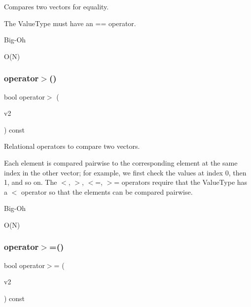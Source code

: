 Compares two vectors for equality. 

The Value\+Type must have an == operator. \begin{DoxyRefDesc}{Big-\/\+Oh}
\item[\mbox{\hyperlink{BigOh__BigOh000146}{Big-\/\+Oh}}]O(\+N) \end{DoxyRefDesc}
\mbox{\label{classVector_a0b8b14442cb420ffaecc0606345e73a1}} 
\subsubsection{\texorpdfstring{operator$>$()}{operator>()}}
{\footnotesize\ttfamily bool operator$>$ (\begin{DoxyParamCaption}\item[{const \mbox{\hyperlink{classVector}{Vector}}$<$ Value\+Type $>$ \&}]{v2 }\end{DoxyParamCaption}) const}



Relational operators to compare two vectors. 

Each element is compared pairwise to the corresponding element at the same index in the other vector; for example, we first check the values at index 0, then 1, and so on. The $<$, $>$, $<$=, $>$= operators require that the Value\+Type has a $<$ operator so that the elements can be compared pairwise. \begin{DoxyRefDesc}{Big-\/\+Oh}
\item[\mbox{\hyperlink{BigOh__BigOh000150}{Big-\/\+Oh}}]O(\+N) \end{DoxyRefDesc}
\mbox{\label{classVector_adaa095641c5fc43f90754d7694784006}} 
\subsubsection{\texorpdfstring{operator$>$=()}{operator>=()}}
{\footnotesize\ttfamily bool operator$>$= (\begin{DoxyParamCaption}\item[{const \mbox{\hyperlink{classVector}{Vector}}$<$ Value\+Type $>$ \&}]{v2 }\end{DoxyParamCaption}) const}



